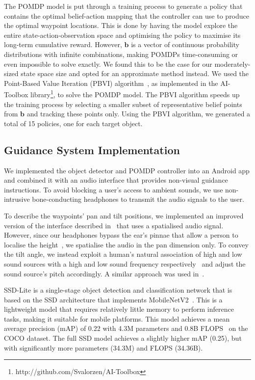 \documentclass[runningheads]{llncs}
\begin{document}
The POMDP model is put through a training process to generate a policy that contains the optimal belief-action mapping that the controller can use to produce the optimal waypoint locations.
This is done by having the model explore the entire state-action-observation space and optimising the policy to maximise its long-term cumulative reward.
However, $\mathbf{b}$ is a vector of continuous probability distributions with infinite combinations, making POMDPs time-consuming or even impossible to solve exactly.
We found this to be the case for our moderately-sized state space size and opted for an approximate method instead.
We used the Point-Based Value Iteration (PBVI) algorithm~\cite{pineau2003point}, as implemented in the AI-Toolbox library\footnote{http://github.com/Svalorzen/AI-Toolbox}, to solve the POMDP model.
The PBVI algorithm speeds up the training process by selecting a smaller subset of representative belief points from $\mathbf{b}$ and tracking these points only. 
Using the PBVI algorithm, we generated a total of 15 policies, one for each target object. 

\subsection{Guidance System Implementation}

We implemented the object detector and POMDP controller into an Android app and combined it with an audio interface that provides non-visual guidance instructions.
To avoid blocking a user's access to ambient sounds, we use non-intrusive bone-conducting headphones to transmit the audio signals to the user. 

To describe the waypoints' pan and tilt positions, we implemented an improved version of the interface described in~\cite{bellotto2013} that uses a spatialised audio signal.
However, since our headphones bypass the ear's pinnae that allow a person to localise the height~\cite{roffler1968factors}, we spatialise the audio in the pan dimension only.
To convey the tilt angle, we instead exploit a human's natural association of high and low sound sources with a high and low sound frequency respectively~\cite{blauert1997spatial} and adjust the sound source's pitch accordingly. 
A similar approach was used in~\cite{schauerte2012assistive}.

SSD-Lite is a single-stage object detection and classification network that is based on the SSD architecture that implements MobileNetV2~\cite{sandler2018mobilenetv2}.
This is a lightweight model that requires relatively little memory to perform inference tasks, making it suitable for mobile platforms. 
This model achieves a mean average precision (mAP) of 0.22 with 4.3M parameters and 0.8B FLOPS~\cite{li2018tinydsod} on the COCO dataset.
The full SSD model achieves a slightly higher mAP (0.25), but with significantly more parameters (34.3M) and FLOPS (34.36B).
\end{document}

